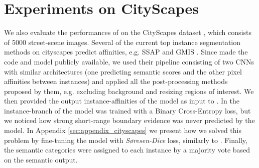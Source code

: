 
\section{Experiments on CityScapes}\label{sec:cityscapes_exp}
We also evaluate the performances of \algname{} on the CityScapes dataset \cite{cordts2016cityscapes}, which consists of 5000 street-scene images.
Several of the current top instance segmentation methods on cityscapes predict affinities, e.g. SSAP \cite{Gao_2019_ICCV} and GMIS \cite{liu2018affinity}. 
Since \cite{liu2018affinity} made the code and model publicly available, we used their pipeline consisting of two CNNs with similar architectures (one predicting semantic scores and the other pixel affinities between instances) and applied all the post-processing methods proposed by them, e.g. excluding background and resizing regions of interest. We then provided the output instance-affinities of the model as input to \algname{}. 
In \cite{liu2018affinity} the instance-branch of the model was trained with a Binary Cross-Entropy loss, but we noticed how strong short-range boundary evidence was never predicted by the model. In Appendix \ref{sec:appendix_cityscapes} we present how we solved this problem by fine-tuning the model with \emph{S\o resen-Dice} loss, similarly to \cite{wolf2018mutex}. Finally, the semantic categories were assigned to each instance by a majority vote based on the semantic output. 

